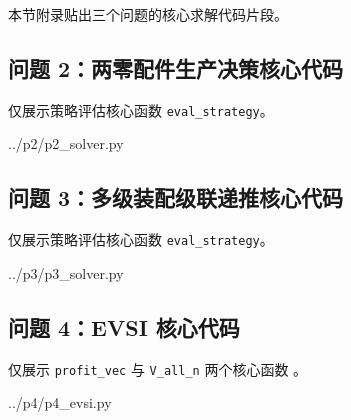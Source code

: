 \documentclass[withoutpreface,bwprint]{cumcmthesis}
\begin{document}
\begin{appendices}
本节附录贴出三个问题的核心求解代码片段。

\subsection{问题 2：两零配件生产决策核心代码}

仅展示策略评估核心函数 \texttt{eval\_strategy}。


              {../p2/p2_solver.py}

\subsection{问题 3：多级装配级联递推核心代码}

仅展示策略评估核心函数 \texttt{eval\_strategy}。


              {../p3/p3_solver.py}

\subsection{问题 4：EVSI 核心代码}

仅展示 \texttt{profit\_vec} 与 \texttt{V\_all\_n} 两个核心函数
。


              {../p4/p4_evsi.py}

\end{appendices}
\end{document}

